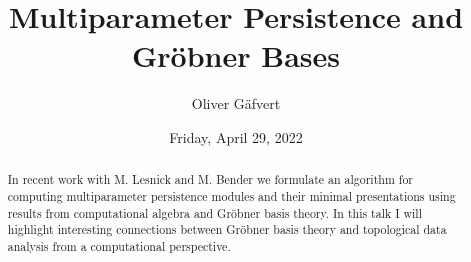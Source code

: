 \documentclass{UAmathtalk}
\author{Oliver G\"afvert}
\title{Multiparameter Persistence and Gr\"obner Bases}
\date{Friday, April 29, 2022}
\begin{document}
\maketitle

\begin{abstract}
In recent work with M. Lesnick and M. Bender we formulate an algorithm for computing multiparameter persistence modules and their minimal presentations using results from computational algebra and Gr\"obner basis theory. In this talk I will highlight interesting connections between Gr\"obner basis theory and topological data analysis from a computational perspective. 
\end{abstract}
\end{document}
